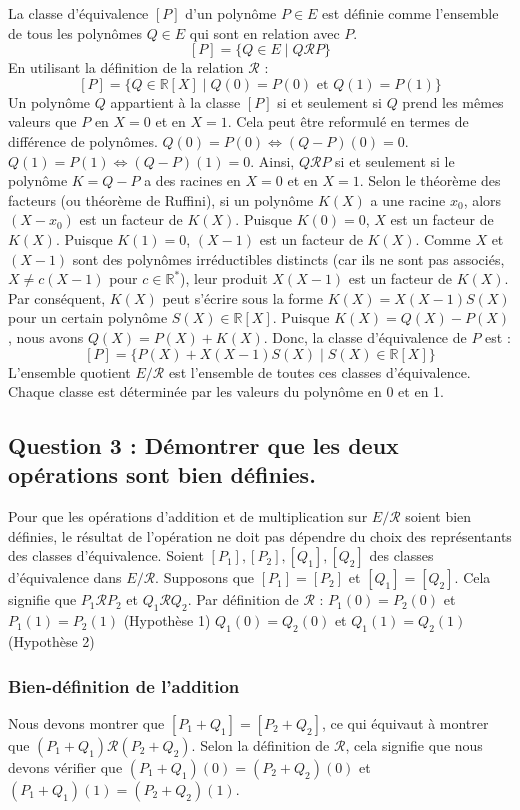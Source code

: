 \documentclass{report}
\begin{document}
La classe d'équivalence $[P]$ d'un polynôme $P \in E$ est définie comme l'ensemble de tous les polynômes $Q \in E$ qui sont en relation avec $P$.
$$[P] = \{Q \in E \mid Q \mathcal{R} P\}$$
En utilisant la définition de la relation $\mathcal{R}$ :
$$[P] = \{Q \in \mathbb{R}[X] \mid Q(0) = P(0) \text{ et } Q(1) = P(1)\}$$
Un polynôme $Q$ appartient à la classe $[P]$ si et seulement si $Q$ prend les mêmes valeurs que $P$ en $X=0$ et en $X=1$.
Cela peut être reformulé en termes de différence de polynômes.
$Q(0) = P(0) \iff (Q-P)(0) = 0$.
$Q(1) = P(1) \iff (Q-P)(1) = 0$.
Ainsi, $Q \mathcal{R} P$ si et seulement si le polynôme $K = Q-P$ a des racines en $X=0$ et en $X=1$.
Selon le théorème des facteurs (ou théorème de Ruffini), si un polynôme $K(X)$ a une racine $x_0$, alors $(X-x_0)$ est un facteur de $K(X)$.
Puisque $K(0)=0$, $X$ est un facteur de $K(X)$.
Puisque $K(1)=0$, $(X-1)$ est un facteur de $K(X)$.
Comme $X$ et $(X-1)$ sont des polynômes irréductibles distincts (car ils ne sont pas associés, $X \neq c(X-1)$ pour $c \in \mathbb{R}^*$), leur produit $X(X-1)$ est un facteur de $K(X)$.
Par conséquent, $K(X)$ peut s'écrire sous la forme $K(X) = X(X-1)S(X)$ pour un certain polynôme $S(X) \in \mathbb{R}[X]$.
Puisque $K(X) = Q(X) - P(X)$, nous avons $Q(X) = P(X) + K(X)$.
Donc, la classe d'équivalence de $P$ est :
$$[P] = \{P(X) + X(X-1)S(X) \mid S(X) \in \mathbb{R}[X]\}$$
L'ensemble quotient $E/\mathcal{R}$ est l'ensemble de toutes ces classes d'équivalence. Chaque classe est déterminée par les valeurs du polynôme en 0 et en 1.

\subsection*{Question 3 : Démontrer que les deux opérations sont bien définies.}

Pour que les opérations d'addition et de multiplication sur $E/\mathcal{R}$ soient bien définies, le résultat de l'opération ne doit pas dépendre du choix des représentants des classes d'équivalence.
Soient $[P_1], [P_2], [Q_1], [Q_2]$ des classes d'équivalence dans $E/\mathcal{R}$.
Supposons que $[P_1] = [P_2]$ et $[Q_1] = [Q_2]$.
Cela signifie que $P_1 \mathcal{R} P_2$ et $Q_1 \mathcal{R} Q_2$.
Par définition de $\mathcal{R}$ :
$P_1(0) = P_2(0)$ et $P_1(1) = P_2(1)$ (Hypothèse 1)
$Q_1(0) = Q_2(0)$ et $Q_1(1) = Q_2(1)$ (Hypothèse 2)

\subsubsection*{Bien-définition de l'addition}
Nous devons montrer que $[P_1+Q_1] = [P_2+Q_2]$, ce qui équivaut à montrer que $(P_1+Q_1) \mathcal{R} (P_2+Q_2)$.
Selon la définition de $\mathcal{R}$, cela signifie que nous devons vérifier que $(P_1+Q_1)(0) = (P_2+Q_2)(0)$ et $(P_1+Q_1)(1) = (P_2+Q_2)(1)$.
\end{document}
